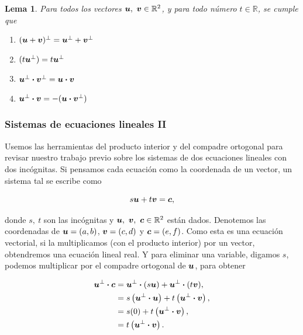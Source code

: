 \documentclass{article}
\theoremstyle{definicion}
\theoremstyle{definition}             %
\theoremstyle{definition}             %
\theoremstyle{definition}
\theoremstyle{definition}
\theoremstyle{observacion}
\theoremstyle{definition}
\theoremstyle{plain}
\newtheorem{lemma}{Lema}
\theoremstyle{definition}
\theoremstyle{afirmacion}
\theoremstyle{notation}
\theoremstyle{definition}
\begin{document}
        \begin{lemma}
            Para todos los vectores \(\vb*{u},\ \vb*{v} \in \mathbb{R}^{2}\), y para todo número \(t \in \mathbb{R}\), se cumple que

            \begin{enumerate}[label = \textnormal{\Roman*)}]
                \item \((\vb*{u} + \vb*{v})^{\perp} = \vb*{u}^{\perp} + \vb*{v}^{\perp}\)
                \item \((t\vb*{u}^{\perp}) = t\vb*{u}^{\perp}\)
                \item \(\vb*{u}^{\perp} \vdot \vb*{v}^{\perp} = \vb*{u} \vdot \vb*{v}\)
                \item \(\vb*{u}^{\perp} \vdot \vb*{v} = -(\vb*{u} \vdot \vb*{v}^{\perp})\)
            \end{enumerate}
        \end{lemma}

        \subsubsection*{Sistemas de ecuaciones lineales II}

        Usemos las herramientas del producto interior y del compadre ortogonal para revisar nuestro trabajo previo sobre los sistemas de dos ecuaciones lineales con dos incógnitas. Si pensamos cada ecuación como la coordenada de un vector, un sistema tal se escribe como

        \begin{equation*}
            s\vb*{u} + t\vb*{v} = \vb*{c},
        \end{equation*}

        donde \(s,\ t\) son las incógnitas y \(\vb*{u},\ \vb*{v},\ \vb*{c} \in \mathbb{R}^{2}\) están dados. Denotemos las coordenadas de \(\vb*{u} = (a, b)\), \(\vb*{v} = (c, d)\) y \(\vb*{c} = (e, f)\). Como esta es una ecuación vectorial, si la multiplicamos (con el producto interior) por un vector, obtendremos una ecuación lineal real. Y para eliminar una variable, digamos \(s\), podemos multiplicar por el compadre ortogonal de \(\vb*{u}\), para obtener

        \begin{align*}
            \vb*{u}^{\perp} \vdot \vb*{c} &= \vb*{u}^{\perp} \vdot (s\vb*{u}) + \vb*{u}^{\perp} \vdot (t\vb*{v}),\\
            &= s\left(\vb*{u}^{\perp} \vdot \vb*{u}\right) + t\left(\vb*{u}^{\perp} \vdot \vb*{v}\right),\\
            &= s(0) + t\left(\vb*{u}^{\perp} \vdot \vb*{v}\right),\\
            &=  t\left(\vb*{u}^{\perp} \vdot \vb*{v}\right).
        \end{align*}
\end{document}

